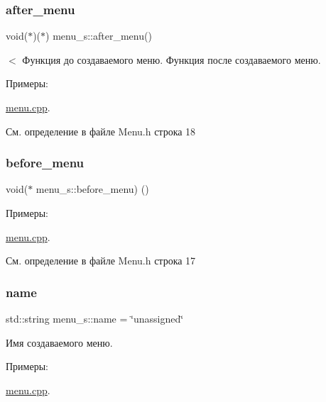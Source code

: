 \subsubsection{\texorpdfstring{after\+\_\+menu}{after\_menu}}
{\footnotesize\ttfamily void($\ast$)($\ast$) menu\+\_\+s\+::after\+\_\+menu()}

$<$ Функция до создаваемого меню. Функция после создаваемого меню. \begin{Desc}
\item[Примеры\+: ]\par
\hyperlink{menu_8cpp-example}{menu.\+cpp}.\end{Desc}


См. определение в файле Menu.\+h строка 18

\mbox{\label{structmenu__s_a856a04d9c6a20c33b0a763149aa021fc}} 
\subsubsection{\texorpdfstring{before\+\_\+menu}{before\_menu}}
{\footnotesize\ttfamily void($\ast$ menu\+\_\+s\+::before\+\_\+menu) ()}

\begin{Desc}
\item[Примеры\+: ]\par
\hyperlink{menu_8cpp-example}{menu.\+cpp}.\end{Desc}


См. определение в файле Menu.\+h строка 17

\mbox{\label{structmenu__s_a2b4d6cd699b46daba2bb8297c11971aa}} 
\subsubsection{\texorpdfstring{name}{name}}
{\footnotesize\ttfamily std\+::string menu\+\_\+s\+::name = \char`\"{}unassigned\char`\"{}}

Имя создаваемого меню. \begin{Desc}
\item[Примеры\+: ]\par
\hyperlink{menu_8cpp-example}{menu.\+cpp}.\end{Desc}


